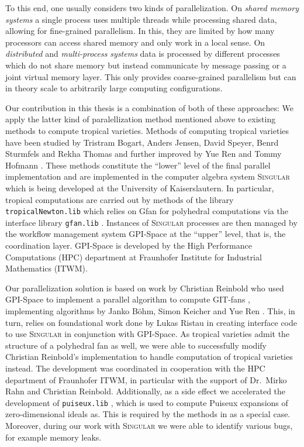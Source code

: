 \documentclass[
  paper=a4,
  titlepage,
  bibliography=totoc,
  pagesize=pdftex
]{scrartcl}
\numberwithin{figure}{section}
\numberwithin{equation}{section}
\numberwithin{table}{section}
\theoremstyle{definition}
\numberwithin{definition}{section}
\begin{document}
To this end, one usually considers two kinds of parallelization. On \emph{shared memory
systems} a single process uses multiple threads while processing shared data, allowing for
fine-grained parallelism. In this, they are limited by how many processors can access
shared memory and only work in a local sense. On \emph{distributed} and
\emph{multi-process systems} data is processed by different processes which do not share
memory but instead communicate by message passing or a joint virtual memory layer. This
only provides coarse-grained parallelism but can in theory scale to arbitrarily large
computing configurations.

Our contribution in this thesis is a combination of both of these approaches: We apply the
latter kind of paralellization method mentioned above to existing methods to compute
tropical varieties. Methods of computing tropical varieties have been studied by Tristram
Bogart, Anders Jensen, David Speyer, Benrd Sturmfels and Rekha Thomas \cite{compTropVar}
and further improved by Yue Ren and Tommy Hofmann \cite{tropPointsLinks}. These methods
constitute the \enquote{lower} level of the final parallel implementation and are
implemented in the computer algebra system \textsc{Singular} \cite{Singular} which is
being developed at the University of Kaiserslautern. In particular, tropical computations
are carried out by methods of the library \texttt{tropicalNewton.lib} \cite{tropNewtLib}
which relies on Gfan \cite{gfan} for polyhedral computations via the interface library
\texttt{gfan.lib} \cite{gfanLib}. Instances of \textsc{Singular} processes are then
managed by the workflow management system GPI-Space \cite{gpispace} at the \enquote{upper}
level, that is, the coordination layer. GPI-Space is developed by the High Performance
Computations (HPC) department at Fraunhofer Institute for Industrial Mathematics (ITWM).

Our parallelization solution is based on work by Christian Reinbold who used GPI-Space to
implement a parallel algorithm to compute GIT-fans \cite{reinboldGitFan}, implementing
algorithms by Janko Böhm, Simon Keicher and Yue Ren \cite{compGitFan}. This, in turn,
relies on foundational work done by Lukas Ristau in creating interface code to use
\textsc{Singular} in conjunction with GPI-Space. As tropical varieties admit the structure
of a polyhedral fan as well, we were able to successfully modify Christian Reinbold's
implementation to handle computation of tropical varieties instead. The development was
coordinated in cooperation with the HPC department of Fraunhofer ITWM, in particular with
the support of Dr.~Mirko Rahn and Christian Reinbold. Additionally, as a side effect we
accelerated the development of \texttt{puiseux.lib} \cite{puiseuxLib}, which is used to
compute Puiseux expansions of zero-dimensional ideals as. This is required by the methods
in \cite{tropPointsLinks} as a special case. Moreover, during our work with
\textsc{Singular} we were able to identify various bugs, for example memory leaks.
\end{document}
